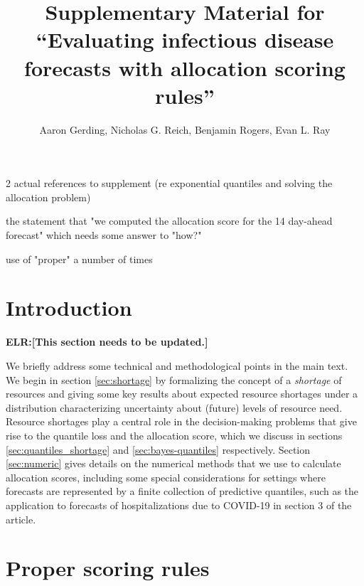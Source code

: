 \documentclass{article}
\title{Supplementary Material for ``Evaluating infectious disease forecasts with allocation scoring rules''}
\author{Aaron Gerding, Nicholas G. Reich, Benjamin Rogers, Evan L. Ray}
\def\elr#1{{\color{cyan}\textbf{ELR:[#1]}}}
\begin{document}
\newcommand{\del}[2]{\frac{\partial {#1} }{\partial {#2}} }
\newcommand{\dby}[2]{\frac{d {#1} }{d {#2}} }
\newcommand{\sbar}{\overline{s}}

\newtheorem{proposition}{Proposition}

\theoremstyle{remark}
\newtheorem*{remark}{Remark}

\maketitle

\tableofcontents

\begin{todolist}
\item 2 actual references to supplement (re exponential quantiles and solving the allocation problem)
\item the statement that "we computed the allocation score for the 14 day-ahead forecast" which needs some answer to "how?"
\item use of "proper" a number of times
\end{todolist}

\section{Introduction}
\label{sec:intro}

\elr{This section needs to be updated.}

We briefly address some technical and methodological points in the main text. We begin in section \ref{sec:shortage} by formalizing the concept of a \emph{shortage} of resources and giving some key results about expected resource shortages under a distribution characterizing uncertainty about (future) levels of resource need. Resource shortages play a central role in the decision-making problems that give rise to the quantile loss and the allocation score, which we discuss in sections \ref{sec:quantiles_shortage} and \ref{sec:bayes-quantiles} respectively. Section \ref{sec:numeric} gives details on the numerical methods that we use to calculate allocation scores, including some special considerations for settings where forecasts are represented by a finite collection of predictive quantiles, such as the application to forecasts of hospitalizations due to COVID-19 in section 3 of the article.

\section{Proper scoring rules}
\label{sec:proper}
\end{document}
